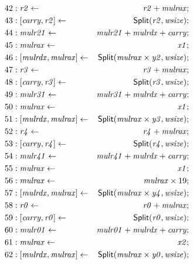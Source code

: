 {\begin{multicols}{2}
\begin{align*}
42 &: \mathit{r2} \leftarrow & \mathit{r2} + \mathit{mulrax}; \\
43 &: \concat{\mathit{carry}}{\mathit{r2}} \leftarrow & \dslcode{Split}(\mathit{r2}, \mathit{wsize}); \\
44 &: \mathit{mulr21} \leftarrow & \mathit{mulr21} + \mathit{mulrdx} + \mathit{carry}; \\
45 &: \mathit{mulrax} \leftarrow & \mathit{x1}; \\
46 &: \concat{\mathit{mulrdx}}{\mathit{mulrax}} \leftarrow & \dslcode{Split}(\mathit{mulrax} \times \mathit{y2}, \mathit{wsize}); \\
47 &: \mathit{r3} \leftarrow & \mathit{r3} + \mathit{mulrax}; \\
48 &: \concat{\mathit{carry}}{\mathit{r3}} \leftarrow & \dslcode{Split}(\mathit{r3}, \mathit{wsize}); \\
49 &: \mathit{mulr31} \leftarrow & \mathit{mulr31} + \mathit{mulrdx} + \mathit{carry}; \\
50 &: \mathit{mulrax} \leftarrow & \mathit{x1}; \\
51 &: \concat{\mathit{mulrdx}}{\mathit{mulrax}} \leftarrow & \dslcode{Split}(\mathit{mulrax} \times \mathit{y3}, \mathit{wsize}); \\
52 &: \mathit{r4} \leftarrow & \mathit{r4} + \mathit{mulrax}; \\
53 &: \concat{\mathit{carry}}{\mathit{r4}} \leftarrow & \dslcode{Split}(\mathit{r4}, \mathit{wsize}); \\
54 &: \mathit{mulr41} \leftarrow & \mathit{mulr41} + \mathit{mulrdx} + \mathit{carry}; \\
55 &: \mathit{mulrax} \leftarrow & \mathit{x1}; \\
56 &: \mathit{mulrax} \leftarrow & \mathit{mulrax} \times 19; \\
57 &: \concat{\mathit{mulrdx}}{\mathit{mulrax}} \leftarrow & \dslcode{Split}(\mathit{mulrax} \times \mathit{y4}, \mathit{wsize}); \\
58 &: \mathit{r0} \leftarrow & \mathit{r0} + \mathit{mulrax}; \\
59 &: \concat{\mathit{carry}}{\mathit{r0}} \leftarrow & \dslcode{Split}(\mathit{r0}, \mathit{wsize}); \\
60 &: \mathit{mulr01} \leftarrow & \mathit{mulr01} + \mathit{mulrdx} + \mathit{carry}; \\
61 &: \mathit{mulrax} \leftarrow & \mathit{x2}; \\
62 &: \concat{\mathit{mulrdx}}{\mathit{mulrax}} \leftarrow & \dslcode{Split}(\mathit{mulrax} \times \mathit{y0}, \mathit{wsize}); \\

\end{align*}
\end{multicols}}
